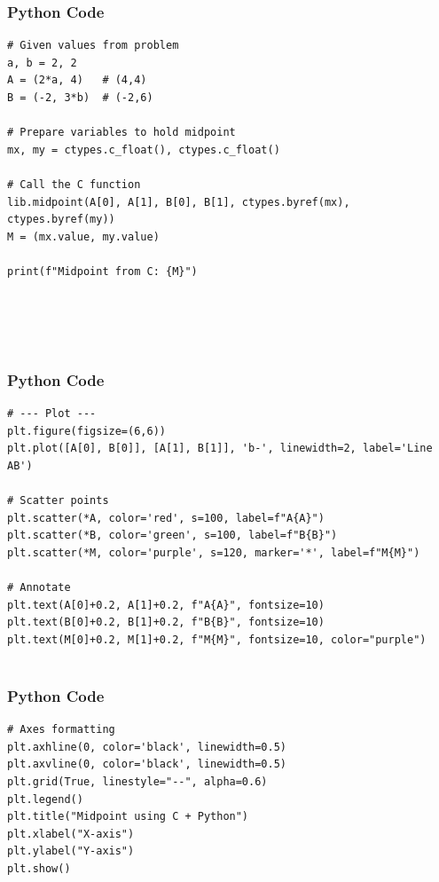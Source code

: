 \documentclass{beamer}
\begin{document}
\begin{frame}[fragile]
    \frametitle{Python Code}
    \begin{lstlisting}
# Given values from problem
a, b = 2, 2
A = (2*a, 4)   # (4,4)
B = (-2, 3*b)  # (-2,6)

# Prepare variables to hold midpoint
mx, my = ctypes.c_float(), ctypes.c_float()

# Call the C function
lib.midpoint(A[0], A[1], B[0], B[1], ctypes.byref(mx), ctypes.byref(my))
M = (mx.value, my.value)

print(f"Midpoint from C: {M}")





    \end{lstlisting}
\end{frame}

\begin{frame}[fragile]
    \frametitle{Python Code}

    \begin{lstlisting}
# --- Plot ---
plt.figure(figsize=(6,6))
plt.plot([A[0], B[0]], [A[1], B[1]], 'b-', linewidth=2, label='Line AB')

# Scatter points
plt.scatter(*A, color='red', s=100, label=f"A{A}")
plt.scatter(*B, color='green', s=100, label=f"B{B}")
plt.scatter(*M, color='purple', s=120, marker='*', label=f"M{M}")

# Annotate
plt.text(A[0]+0.2, A[1]+0.2, f"A{A}", fontsize=10)
plt.text(B[0]+0.2, B[1]+0.2, f"B{B}", fontsize=10)
plt.text(M[0]+0.2, M[1]+0.2, f"M{M}", fontsize=10, color="purple")


    \end{lstlisting}
\end{frame}
\begin{frame}[fragile]
    \frametitle{Python Code}

    \begin{lstlisting}
# Axes formatting
plt.axhline(0, color='black', linewidth=0.5)
plt.axvline(0, color='black', linewidth=0.5)
plt.grid(True, linestyle="--", alpha=0.6)
plt.legend()
plt.title("Midpoint using C + Python")
plt.xlabel("X-axis")
plt.ylabel("Y-axis")
plt.show()


    \end{lstlisting}
\end{frame}
\end{document}
